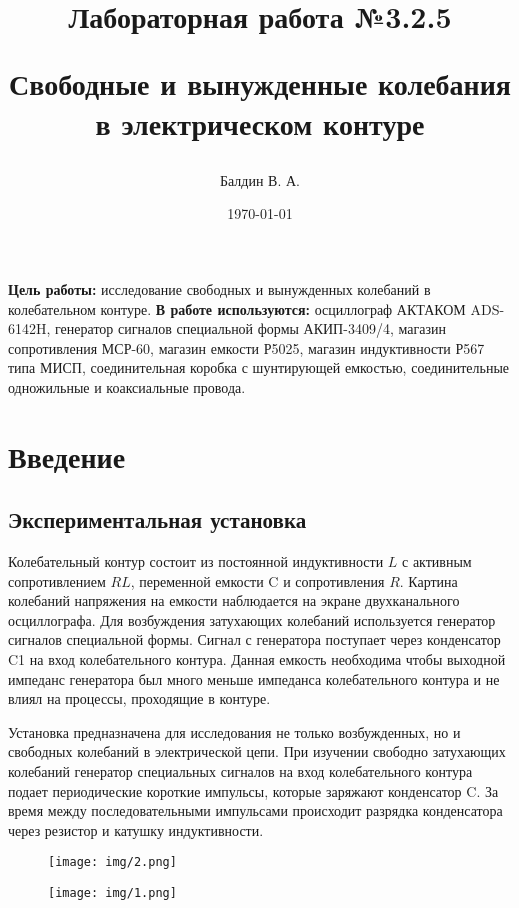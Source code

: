 \documentclass[a4paper, 12pt]{article}
\title{\begin{center}Лабораторная работа №3.2.5\end{center}
Свободные и вынужденные колебания в электрическом контуре}
\author{Балдин В. А.}
\date{\today}
\begin{document}
    \maketitle
    \newpage
    \renewcommand*{\thesubsection}{\thesection.\Alph{subsection}}

    \textbf{Цель работы:} исследование свободных и вынужденных колебаний в колебательном контуре.
    \textbf{В работе используются:} осциллограф АКТАКОМ ADS-6142H, генератор сигналов специальной формы АКИП-3409/4, магазин сопротивления МСР-60, магазин емкости Р5025, магазин индуктивности Р567 типа МИСП, соединительная коробка с шунтирующей емкостью, соединительные одножильные и коаксиальные провода.

    \section{Введение}
        \subsection*{Экспериментальная установка}
            Колебательный контур состоит из постоянной индуктивности $L$ с активным сопротивлением $RL$, переменной емкости C и сопротивления $R$. Картина колебаний напряжения на емкости наблюдается на экране двухканального осциллографа. Для возбуждения затухающих колебаний используется генератор сигналов специальной формы. Сигнал с генератора поступает через конденсатор C1 на вход колебательного контура. Данная емкость необходима чтобы выходной импеданс генератора был много меньше импеданса колебательного контура и не влиял на процессы, проходящие в контуре.

            Установка предназначена для исследования не только возбужденных, но и свободных колебаний в электрической цепи. При изучении свободно затухающих колебаний генератор специальных сигналов на вход колебательного контура подает периодические короткие импульсы, которые заряжают конденсатор C. За время между последовательными импульсами происходит разрядка конденсатора через резистор и катушку индуктивности.
            \begin{figure}[H]
                \centering
                \texttt{[image: img/2.png]}
            \end{figure}
            \begin{figure}[H]
                \centering
                \texttt{[image: img/1.png]}
            \end{figure}
\end{document}
